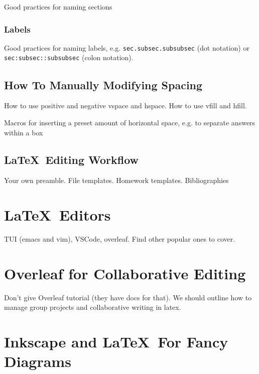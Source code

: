\documentclass[12pt]{article}
\begin{document}
Good practices for naming sections

\subsubsection{Labels}%
\label{bbs.name-convs.labels}

Good practices for naming labels, e.g. \texttt{sec.subsec.subsubsec} (dot notation) or \texttt{sec:subsec::subsubsec} (colon notation).

\subsection{How To Manually Modifying Spacing}%
\label{bbs.spacing}

How to use positive and negative vspace and hspace. How to use vfill and hfill.

Macros for inserting a preset amount of horizontal space, e.g. to separate answers within a box

\subsection{\LaTeX\ Editing Workflow}%
\label{workflow}

Your own preamble. File templates. Homework templates. Bibliographies

\section{\LaTeX\ Editors}%
\label{latex-editors}

TUI (emacs and vim), VSCode, overleaf. Find other popular ones to cover.

\section{Overleaf for Collaborative Editing}%
\label{overleaf}

Don't give Overleaf tutorial (they have docs for that). We should outline how to manage group projects and collaborative writing in latex.

\section{Inkscape and \LaTeX\ For Fancy Diagrams}%
\label{inkscape-latex}
\end{document}
